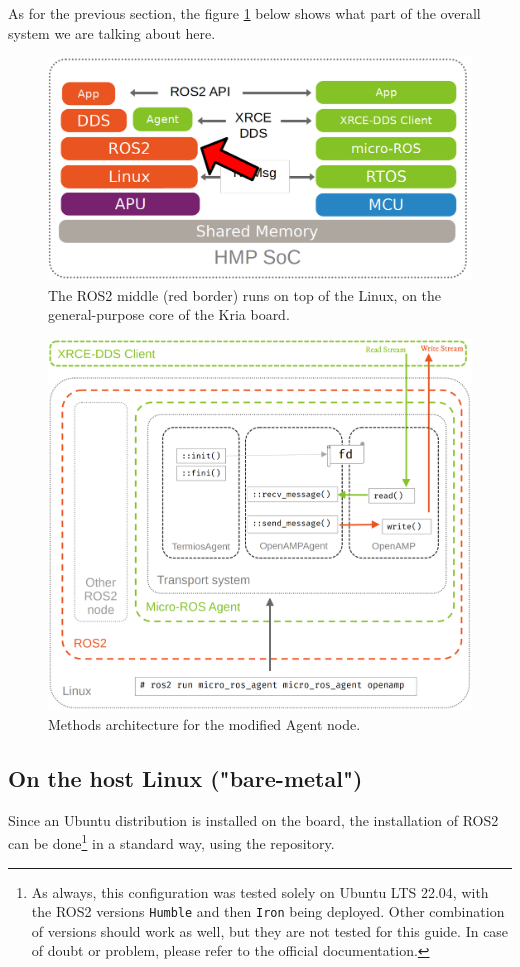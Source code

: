 \documentclass[10pt]{article}
\begin{document}
As for the previous section, the figure \ref{fig:orgfebee33} below shows what part
of the overall system we are talking about here.

\begin{figure}[htbp]
\centering
\includegraphics[width=.6\textwidth]{./img/map_ros.png}
\caption{\label{fig:orgfebee33}The ROS2 middle (red border) runs on top of the Linux, on the general-purpose core of the Kria board.}
\end{figure}

\begin{figure}[htbp]
\centering
\includegraphics[width=.55\textwidth]{./img/agent_arch.png}
\caption{\label{fig:org57edba4}Methods architecture for the modified Agent node.}
\end{figure}

\subsection{On the host Linux ("bare-metal")}
\label{sec:org2c041dd}
Since an Ubuntu distribution is installed on the board, the installation of ROS2
can be done\footnote{As always, this configuration was tested solely on Ubuntu LTS 22.04,
with the ROS2 versions \texttt{Humble} and then \texttt{Iron} being deployed.
Other combination of versions should work as well, but they are not
tested for this guide. In case of doubt or problem, please refer to the official documentation.} in a standard way, using the repository.
\end{document}
